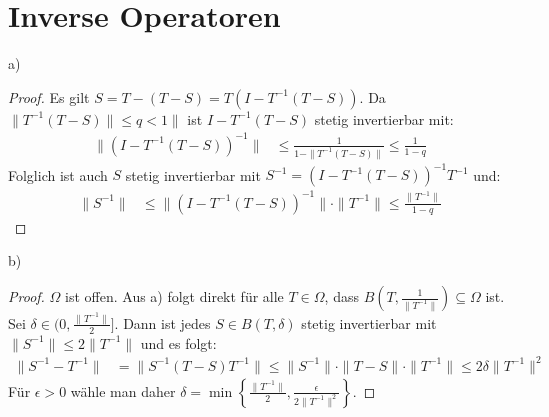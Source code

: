 \documentclass[a4paper,12pt]{article}
\newcommand{\kla}{}
\newcommand{\klammer}{}
\begin{document}
\section{Inverse Operatoren}
a)
\begin{proof}
Es gilt $S=T-(T-S)=T(I-T^{-1}(T-S))$. Da $\|T^{-1}(T-S)\|\le q<1\| $ ist $I-T^{-1}(T-S)$ stetig invertierbar mit:
\begin{align*}
\|(I-T^{-1}(T-S))^{-1}\|&\le\frac{1}{1-\|T^{-1}(T-S)\|}\le\frac{1}{1-q}
\end{align*}
Folglich ist auch $S$ stetig invertierbar mit $S^{-1}=\kla\left( {I-T^{-1}(T-S)} \right)^{-1}T^{-1}$ und:
\begin{align*}
\|S^{-1}\|&\le\|\kla\left( {I-T^{-1}(T-S)} \right)^{-1}\|\cdot\|T^{-1}\|\le\frac{\|T^{-1}\|}{1-q}
\end{align*}
\end{proof}
b)
\begin{proof}
$\Omega$ ist offen. Aus a) folgt direkt für alle $T\in\Omega$, dass $B(T,\frac{1}{\|T^{-1}\|})\subseteq\Omega$ ist. \\
Sei $\delta\in (0,\frac{\|T^{-1}\|}{2}]$. Dann ist jedes $S\in B(T,\delta)$ stetig invertierbar mit $\|S^{-1}\|\le 2\|T^{-1}\|$ und es folgt:
\begin{align*}
\|S^{-1}-T^{-1}\|&=\|S^{-1}(T-S)T^{-1}\|\le \|S^{-1}\|\cdot\|T-S\|\cdot\|T^{-1}\|\le 2\delta\|T^{-1}\|^2
\end{align*}
Für $\epsilon> 0$ wähle man daher $\delta =\min\klammer\left\{ {\frac{\|T^{-1}\|}{2},\frac{\epsilon}{2\|T^{-1}\|^2}} \right\}$.
\end{proof}
\end{document}
